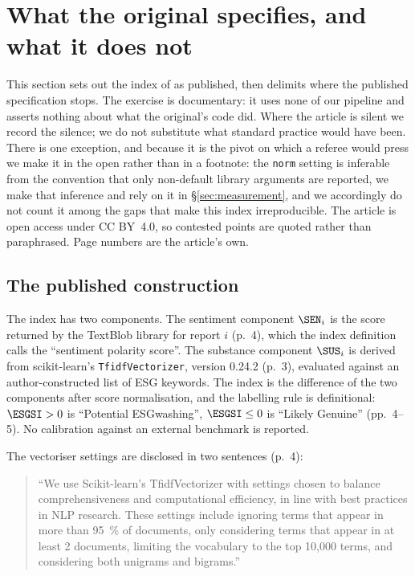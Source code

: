 \section{What the original specifies, and what it does not}
\label{sec:original}

This section sets out the index of \citet{lagasio2024} as published, then delimits where
the published specification stops. The exercise is documentary: it uses none of our
pipeline and asserts nothing about what the original's code did. Where the article is
silent we record the silence; we do not substitute what standard practice would have been.
There is one exception, and because it is the pivot on which a referee would press we make
it in the open rather than in a footnote: the \texttt{norm} setting is inferable from the
convention that only non-default library arguments are reported, we make that inference and
rely on it in \S\ref{sec:measurement}, and we accordingly do not count it among the gaps
that make this index irreproducible.
The article is open access under CC BY~4.0, so contested points are quoted rather than
paraphrased. Page numbers are the article's own.

\subsection{The published construction}

The index has two components. The sentiment component $\SEN_i$ is the score returned by the
TextBlob library for report $i$ (p.~4), which the index definition calls the ``sentiment
polarity score''. The substance component $\SUS_i$ is derived from scikit-learn's
\texttt{TfidfVectorizer}, version 0.24.2 (p.~3), evaluated against an author-constructed
list of ESG keywords. The index is the difference of the two components
after score normalisation, and the labelling rule is definitional: $\ESGSI > 0$ is
``Potential ESGwashing'', $\ESGSI \le 0$ is ``Likely Genuine'' (pp.~4--5). No calibration
against an external benchmark is reported.

The vectoriser settings are disclosed in two sentences (p.~4):

\begin{quote}
``We use Scikit-learn's TfidfVectorizer with settings chosen to balance comprehensiveness
and computational efficiency, in line with best practices in NLP research. These settings
include ignoring terms that appear in more than 95~\% of documents, only considering terms
that appear in at least 2 documents, limiting the vocabulary to the top 10,000 terms, and
considering both unigrams and bigrams.''
\end{quote}

